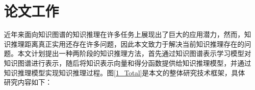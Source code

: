 \documentclass[algorithmlist, AutoFakeBold, AutoFakeSlant, figurelist, tablelist, nomlist, engineering, openany]{seuthesix} %
\begin{document}
\section{论文工作}


近年来面向知识图谱的知识推理在许多任务上展现出了巨大的应用潜力，然而，知识推理距离真正实用还存在许多问题，因此本文致力于解决当前知识推理存在的问题。本文计划提出一种两阶段的知识推理方法，首先通过知识图谱表示学习模型对知识图谱进行表示，随后将知识表示向量和得分函数提供给知识推理模型，并通过知识推理模型实现知识推理过程。图\ref{1_Total}是本文的整体研究技术框架，具体研究内容如下：
\end{document}
